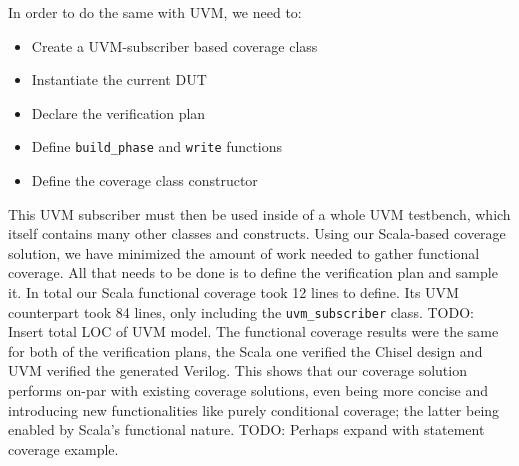 \documentclass[conference]{IEEEtran}
\newcommand{\todo}[1]{{\color{olive} TODO: #1}}
\newcommand{\martin}[1]{{\color{blue} Martin: #1}}
\begin{document}
In order to do the same with UVM, we need to:  
\begin{itemize}
    \item Create a UVM-subscriber based coverage class
    \item Instantiate the current DUT %
    \item Declare the verification plan
    \item Define \texttt{build\_phase} and \texttt{write} functions
    \item Define the coverage class constructor
\end{itemize}  
This UVM subscriber must then be used inside of a whole UVM testbench, which itself contains many other classes and constructs.
Using our Scala-based coverage solution, we have minimized the amount of work needed to gather functional coverage. 
All that needs to be done is to define the verification plan and sample it.
In total our Scala functional coverage took 12 lines to define.
Its UVM counterpart took 84 lines, only including the \texttt{uvm\_subscriber} class. \todo{Insert total LOC of UVM model.}
The functional coverage results were the same for both of the verification plans, the Scala one verified the Chisel design and UVM verified the generated Verilog.
This shows that our coverage solution performs on-par with existing coverage solutions, even being more concise and introducing new functionalities like purely conditional coverage; the latter being enabled by Scala's functional nature. 
\todo{Perhaps expand with statement coverage example.}

\end{document}
